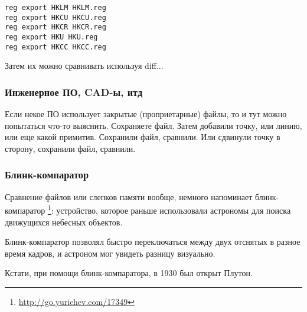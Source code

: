 \begin{lstlisting}
reg export HKLM HKLM.reg
reg export HKCU HKCU.reg
reg export HKCR HKCR.reg
reg export HKU HKU.reg
reg export HKCC HKCC.reg
\end{lstlisting}

Затем их можно сравнивать используя diff...

\subsubsection{Инженерное ПО, CAD-ы, итд}

Если некое ПО использует закрытые (проприетарные) файлы, то и тут можно попытаться что-то выяснить.
Сохраняете файл.
Затем добавили точку, или линию, или еще какой примитив.
Сохранили файл, сравнили.
Или сдвинули точку в сторону, сохранили файл, сравнили.

\subsubsection{Блинк-компаратор}

Сравнение файлов или слепков памяти вообще, немного напоминает блинк-компаратор
\footnote{\url{http://go.yurichev.com/17349}}:
устройство, которое раньше использовали астрономы для поиска движущихся небесных объектов.

Блинк-компаратор позволял быстро переключаться между двух отснятых в разное время кадров,
и астроном мог увидеть разницу визуально.

Кстати, при помощи блинк-компаратора, в 1930 был открыт Плутон.

